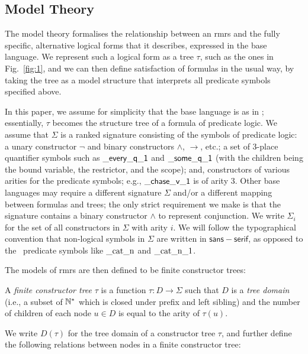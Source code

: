\subsection{Model Theory} \label{sec:model-theory}

The model theory formalises the relationship between an {\sc rmrs} and
the fully specific, alternative logical forms that it describes,
expressed in the base language.  We represent such a logical form as a
tree $\tau$, such as the ones in Fig.~\ref{fig:1}, and we can then
define satisfaction of formulas in the usual way, by taking the tree
as a model structure that interprets all predicate symbols specified
above.

In this paper, we assume for simplicity that the base language is as
in \mrs; essentially, $\tau$ becomes the structure tree of a formula
of predicate logic.  We assume that $\Sigma$ is a ranked signature
consisting of the symbols of predicate logic: a unary constructor
$\neg$ and binary constructors $\wedge$, $\rightarrow$, etc.; a set of
3-place quantifier symbols such as $\mathsf{\_every\_q\_1}$ and
$\mathsf{\_some\_q\_1}$ (with the children being the bound variable, the
restrictor, and the scope); and, constructors of various arities for
the predicate symbols; e.g., $\mathsf{\_chase\_v\_1}$ is of arity 3.  Other
base languages may require a different signature $\Sigma$ and/or a
different mapping between formulas and trees; the only strict
requirement we make is that the signature contains a binary
constructor $\wedge$ to represent conjunction.  We write $\Sigma_i$
for the set of all constructors in $\Sigma$ with arity $i$.  We
will follow the typographical convention that non-logical symbols in
$\Sigma$ are written in $\mathsf{sans{-}serif}$, as opposed to the
\rmrs\ predicate symbols like $\mathrm{\_cat\_n}$ and
$\mathrm{\_cat\_n\_1}$.

The models of {\sc rmrs} are then defined to be finite constructor
trees:
\begin{definition}\label{defn:models}
  A {\em finite constructor tree} $\tau$ is a function $\tau:D
  \rightarrow \Sigma$ such that $D$ is a \emph{tree domain} (i.e., a
  subset of $\mathbb{N}^*$ which is closed under prefix and left sibling) and
  the number of children of each node $u \in D$ is equal to the arity
  of $\tau(u)$.  
\end{definition}

We write $D(\tau)$ for the tree domain of a constructor tree $\tau$,
and further define the following relations between nodes in a finite
constructor tree:

